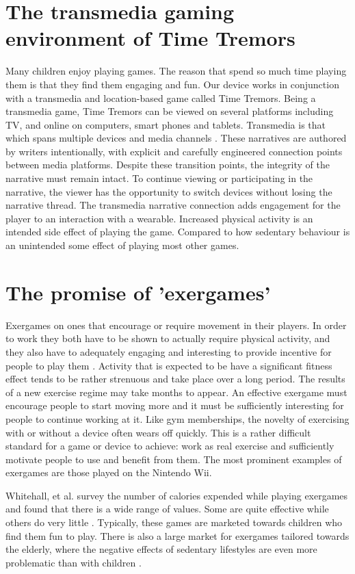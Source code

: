 \documentclass{SIGCHI2015LaTex/sigchi}
\begin{document}
\section{The transmedia gaming environment of Time Tremors}
Many children enjoy playing games. The reason that spend so much time playing them is that they find them engaging and fun. Our device works in conjunction with a transmedia and location-based game called Time Tremors. Being a transmedia game, Time Tremors can be viewed on several platforms including TV, and online on computers, smart phones and tablets. Transmedia is that which spans multiple devices and media channels \cite{phillips2012creators}. These narratives are authored by writers intentionally, with explicit and carefully engineered connection points between media platforms. Despite these transition points, the integrity of the narrative must remain intact. To continue viewing or participating in the narrative, the viewer has the opportunity to switch devices without losing the narrative thread. The transmedia narrative connection adds engagement for the player to an interaction with a wearable. Increased physical activity is an intended side effect of playing the game. Compared to how sedentary behaviour is an unintended some effect of playing most other games.

\section{The promise of 'exergames'}
Exergames on ones that encourage or require movement in their players. In order to work they both have to be shown to actually require physical activity, and they also have to adequately engaging and interesting to provide incentive for people to play them \cite{whitehead2010exergame}. Activity that is expected to be have a significant fitness effect tends to be rather strenuous and take place over a long period. The results of a new exercise regime may take months to appear. An effective exergame must encourage people to start moving more and it must be sufficiently interesting for people to continue working at it. Like gym memberships, the novelty of exercising with or without a device often wears off quickly. This is a rather difficult standard for a game or device to achieve: work as real exercise and sufficiently motivate people to use and benefit from them. The most prominent examples of exergames are those played on the Nintendo Wii. 

Whitehall, et al. survey the number of calories expended while playing exergames and found that there is a wide range of values. Some are quite effective while others do very little \cite{whitehead2010exergame}. Typically, these games are marketed towards children who find them fun to play. There is also a large market for exergames tailored towards the elderly, where the negative effects of sedentary lifestyles are even more problematic than with children \cite{vonstad2014exergaming}.
\end{document}
